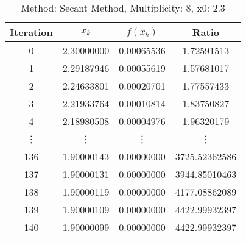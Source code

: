 \begin{table}
\centering
\caption{Method: Secant Method, Multiplicity: 8, x0: 2.3}
\label{tab:table_Secant_Method_8_2_3}
\begin{tabular}{c c c c}
\toprule
Iteration &      $x_k$ &   $f(x_k)$ &         Ratio \\
\midrule
        0 & 2.30000000 & 0.00065536 &    1.72591513 \\
        1 & 2.29187946 & 0.00055619 &    1.57681017 \\
        2 & 2.24633801 & 0.00020701 &    1.77557433 \\
        3 & 2.21933764 & 0.00010814 &    1.83750827 \\
        4 & 2.18980508 & 0.00004976 &    1.96320179 \\
   \vdots &     \vdots &     \vdots &        \vdots \\
      136 & 1.90000143 & 0.00000000 & 3725.52362586 \\
      137 & 1.90000131 & 0.00000000 & 3944.85010463 \\
      138 & 1.90000119 & 0.00000000 & 4177.08862089 \\
      139 & 1.90000109 & 0.00000000 & 4422.99932397 \\
      140 & 1.90000099 & 0.00000000 & 4422.99932397 \\
\bottomrule
\end{tabular}
\end{table}
